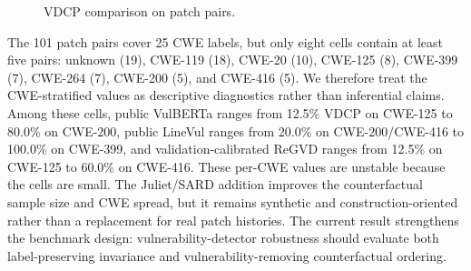 \documentclass[a4paper,fleqn]{cas-dc}
\begin{document}
\begin{table}[t]
  \centering
  \caption{Exploratory counterfactual patch-pair ordering.}
  \label{tab:counterfactual-patch-probe}
\end{table}

\begin{figure}
  \centering
  \resizebox{\columnwidth}{!}{}
  \caption{VDCP comparison on patch pairs.}
  \label{fig:vdcp-patch-pairs}
\end{figure}

The 101 patch pairs cover 25 CWE labels, but only eight cells contain at least
five pairs: unknown (19), CWE-119 (18), CWE-20 (10), CWE-125 (8), CWE-399 (7),
CWE-264 (7), CWE-200 (5), and CWE-416 (5). We therefore treat the
CWE-stratified values as descriptive diagnostics rather than inferential
claims. Among these cells, public VulBERTa ranges from 12.5\% VDCP on CWE-125
to 80.0\% on CWE-200, public LineVul ranges from 20.0\% on CWE-200/CWE-416 to
100.0\% on CWE-399, and validation-calibrated ReGVD ranges from 12.5\% on
CWE-125 to 60.0\% on CWE-416. These per-CWE values are unstable because the
cells are small. The Juliet/SARD addition improves the counterfactual sample
size and CWE spread, but it remains synthetic and construction-oriented rather
than a replacement for real patch histories. The current result strengthens the
benchmark design: vulnerability-detector robustness should evaluate both
label-preserving invariance and vulnerability-removing counterfactual ordering.
\end{document}

